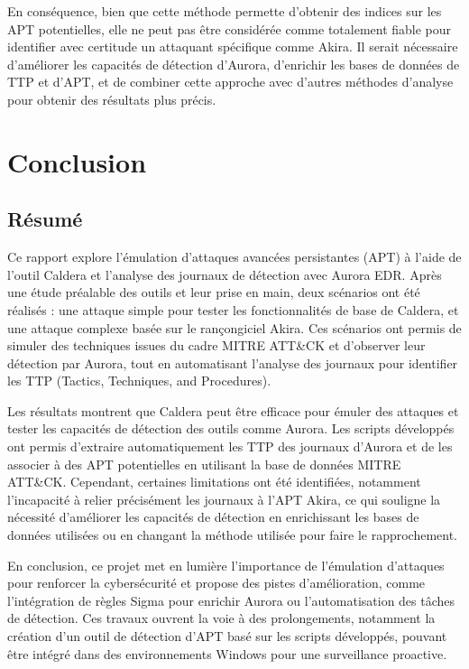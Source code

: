 \documentclass[12pt,letterpaper]{article}
\begin{document}
\bigskip

En conséquence, bien que cette méthode permette d'obtenir des indices sur les APT potentielles, elle ne peut pas être considérée comme totalement fiable pour identifier avec certitude un attaquant spécifique comme Akira.
Il serait nécessaire d'améliorer les capacités de détection d'Aurora, d'enrichir les bases de données de TTP et d'APT, et de combiner cette approche avec d'autres méthodes d'analyse pour obtenir des résultats plus précis.

\newpage
\section{Conclusion}

\subsection{Résumé}
Ce rapport explore l'émulation d'attaques avancées persistantes (APT) à l'aide de l'outil Caldera et l'analyse des journaux de détection avec Aurora EDR.
Après une étude préalable des outils et leur prise en main, deux scénarios ont été réalisés : une attaque simple pour tester les fonctionnalités de base de Caldera, et une attaque complexe basée sur le rançongiciel Akira.
Ces scénarios ont permis de simuler des techniques issues du cadre MITRE ATT\&CK et d'observer leur détection par Aurora, tout en automatisant l'analyse des journaux pour identifier les TTP (Tactics, Techniques, and Procedures).

\bigskip

Les résultats montrent que Caldera peut être efficace pour émuler des attaques et tester les capacités de détection des outils comme Aurora.
Les scripts développés ont permis d'extraire automatiquement les TTP des journaux d'Aurora et de les associer à des APT potentielles en utilisant la base de données MITRE ATT\&CK.
Cependant, certaines limitations ont été identifiées, notamment l'incapacité à relier précisément les journaux à l'APT Akira, ce qui souligne la nécessité d'améliorer les capacités de détection en enrichissant les bases de données utilisées ou en changant la méthode utilisée pour faire le rapprochement.

\bigskip

En conclusion, ce projet met en lumière l'importance de l'émulation d'attaques pour renforcer la cybersécurité et propose des pistes d'amélioration, comme l'intégration de règles Sigma pour enrichir Aurora ou l'automatisation des tâches de détection.
Ces travaux ouvrent la voie à des prolongements, notamment la création d'un outil de détection d'APT basé sur les scripts développés, pouvant être intégré dans des environnements Windows pour une surveillance proactive.
\end{document}
